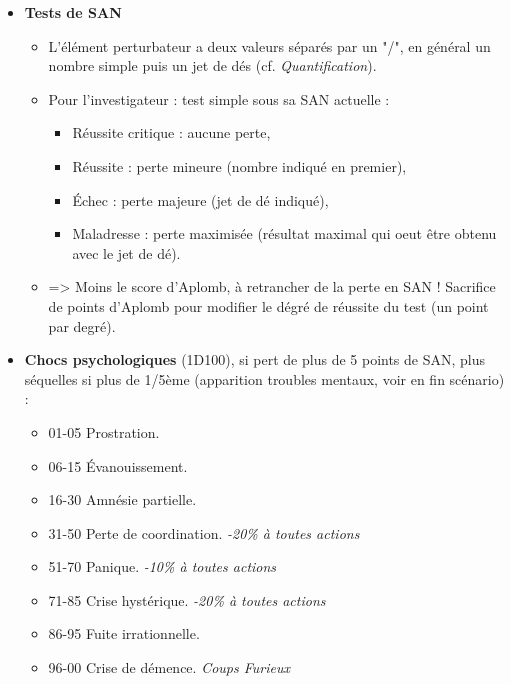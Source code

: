 \documentclass[11pt,twoside,a4paper]{article}
\begin{document}
\begin{multicols*}{2}
\begin{itemize}
	\item[] \textbf{Tests de SAN}
	\begin{itemize}
		\item[] L'{\'e}l{\'e}ment perturbateur a deux valeurs s{\'e}par{\'e}s par un "/", en g{\'e}n{\'e}ral un nombre simple puis un jet de d{\'e}s (cf. \emph{Quantification}). 
		\item[] Pour l'investigateur : test simple sous sa SAN actuelle : 
		\begin{itemize}
			\item R{\'e}ussite critique : aucune perte, 
			\item R{\'e}ussite : perte mineure (nombre indiqu{\'e} en premier), 
			\item {\'E}chec : perte majeure (jet de d{\'e} indiqu{\'e}), 
			\item Maladresse : perte maximis{\'e}e (r{\'e}sultat maximal qui oeut {\^e}tre obtenu avec le jet de d{\'e}). 
		\end{itemize}
		\item[] => Moins le score d'Aplomb, {\`a} retrancher de la perte en SAN ! Sacrifice de points d'Aplomb pour modifier le d{\'e}gr{\'e} de r{\'e}ussite du test (un point par degr{\'e}). 
	\end{itemize}
	
	\item[] \textbf{Chocs psychologiques} (1D100), si pert de plus de 5 points de SAN, plus s{\'e}quelles si plus de 1/5{\`e}me (apparition troubles mentaux, voir en fin sc{\'e}nario) : 
	\begin{itemize}
		\item[] 01-05	Prostration. 
		\item[] 06-15	{\'E}vanouissement. 
		\item[] 16-30	Amn{\'e}sie partielle. 
		\item[] 31-50	Perte de coordination. 	\emph{-20\% {\`a} toutes actions}
		\item[] 51-70	Panique. 	\emph{-10\% {\`a} toutes actions}
		\item[] 71-85	Crise hyst{\'e}rique. 	\emph{-20\% {\`a} toutes actions}
		\item[] 86-95	Fuite irrationnelle. 
		\item[] 96-00	Crise de d{\'e}mence. 	\emph{Coups Furieux}
	\end{itemize}
\end{itemize}

\end{multicols*}
\end{document}
